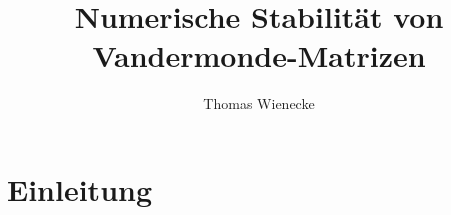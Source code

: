 \documentclass[a4paper, oneside, 11pt]{scrreprt}
\title{Numerische Stabilität von Vandermonde-Matrizen}
\author{Thomas Wienecke}
\begin{document}
\maketitle
\tableofcontents

\chapter{Einleitung}

%












\end{document}
